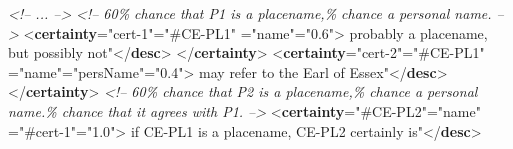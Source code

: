 \begin{shaded}
\textit{<!-- ... -->}\mbox{}\newline 
\textit{<!-- 60\% chance that P1 is a placename,\% chance a personal name. -->}\mbox{}\newline 
{<\textbf{certainty}\hspace*{1em}{xml:id}="{cert-1}"\hspace*{1em}{target}="{\#CE-PL1}"\mbox{}\newline 
\hspace*{1em}{locus}="{name}"\hspace*{1em}{degree}="{0.6}">}\mbox{}\newline 
{}probably a placename, but possibly not"{</\textbf{desc}>}\mbox{}\newline 
{</\textbf{certainty}>}\mbox{}\newline 
{<\textbf{certainty}\hspace*{1em}{xml:id}="{cert-2}"\hspace*{1em}{target}="{\#CE-PL1}"\mbox{}\newline 
\hspace*{1em}{locus}="{name}"\hspace*{1em}{assertedValue}="{persName}"\hspace*{1em}{degree}="{0.4}">}\mbox{}\newline 
{}may refer to the Earl of Essex"{</\textbf{desc}>}\mbox{}\newline 
{</\textbf{certainty}>}\mbox{}\newline 
\textit{<!-- 60\% chance that P2 is a placename,\% chance a personal name.\% chance that it agrees with P1. -->}\mbox{}\newline 
{<\textbf{certainty}\hspace*{1em}{target}="{\#CE-PL2}"\hspace*{1em}{locus}="{name}"\mbox{}\newline 
\hspace*{1em}{given}="{\#cert-1}"\hspace*{1em}{degree}="{1.0}">}\mbox{}\newline 
{}if CE-PL1 is a placename, CE-PL2 certainly is"{</\textbf{desc}>}\mbox{}\newline 

\end{shaded}
